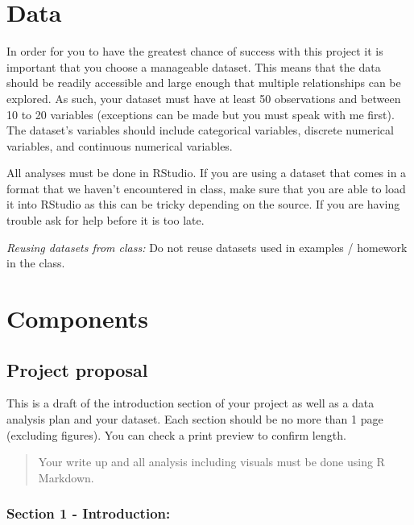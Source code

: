\documentclass[
]{book}
\begin{document}
\hypertarget{data-1}{%
\section{Data}\label{data-1}}

In order for you to have the greatest chance of success with this project it is important that
you choose a manageable dataset. This means that the data should be readily accessible and large
enough that multiple relationships can be explored. As such, your dataset must have at least 50
observations and between 10 to 20 variables (exceptions can be made but you must speak with me
first). The dataset's variables should include categorical variables, discrete numerical
variables, and continuous numerical variables.

All analyses must be done in RStudio. If you are using a dataset that comes in a format that
we haven't encountered in class, make sure that you are able to load it into RStudio as this
can be tricky depending on the source. If you are having trouble ask for help before it is too late.

\emph{Reusing datasets from class:} Do not reuse datasets used in examples / homework in the
class.

\hypertarget{components}{%
\section{Components}\label{components}}

\hypertarget{project-proposal}{%
\subsection{Project proposal}\label{project-proposal}}

This is a draft of the introduction section of your project as well as a
data analysis plan and your dataset. Each section should be no more than 1
page (excluding figures). You can check a print preview to confirm length.

\begin{quote}
Your write up and all analysis including visuals must be done using R Markdown.
\end{quote}

\hypertarget{section-1---introduction}{%
\subsubsection{Section 1 - Introduction:}\label{section-1---introduction}}
\end{document}
